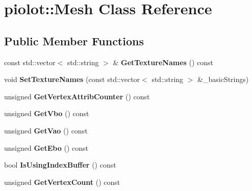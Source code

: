 \hypertarget{classpiolot_1_1_mesh}{}\section{piolot\+:\+:Mesh Class Reference}
\label{classpiolot_1_1_mesh}
\subsection*{Public Member Functions}
\begin{DoxyCompactItemize}
\item 
\mbox{\label{classpiolot_1_1_mesh_a9351991e7afd13a3c121aedc5577cfd9}} 
const std\+::vector$<$ std\+::string $>$ \& {\bfseries Get\+Texture\+Names} () const
\item 
\mbox{\label{classpiolot_1_1_mesh_a5d5f50621cac37966f39e6ee09788949}} 
void {\bfseries Set\+Texture\+Names} (const std\+::vector$<$ std\+::string $>$ \&\+\_\+basic\+Strings)
\item 
\mbox{\label{classpiolot_1_1_mesh_a2864e1da1d187185cebc55790f6d5940}} 
unsigned {\bfseries Get\+Vertex\+Attrib\+Counter} () const
\item 
\mbox{\label{classpiolot_1_1_mesh_a755867d22123118a4b4e00bbf677e987}} 
unsigned {\bfseries Get\+Vbo} () const
\item 
\mbox{\label{classpiolot_1_1_mesh_a8f4122e191086d7f5e95250a80766d82}} 
unsigned {\bfseries Get\+Vao} () const
\item 
\mbox{\label{classpiolot_1_1_mesh_afe44ffdc27bc839ec6139f801e2efae9}} 
unsigned {\bfseries Get\+Ebo} () const
\item 
\mbox{\label{classpiolot_1_1_mesh_a4336c9ab2304035ab8e2a7fdad9233e7}} 
bool {\bfseries Is\+Using\+Index\+Buffer} () const
\item 
\mbox{\label{classpiolot_1_1_mesh_a48f0c3d62435199c10ce0169a079c995}} 
unsigned {\bfseries Get\+Vertex\+Count} () const
\item 
\mbox{\label{classpiolot_1_1_mesh_aaeaf1e4a7ed7fff6c27103393077c6f3}} 

\end{DoxyCompactItemize}
